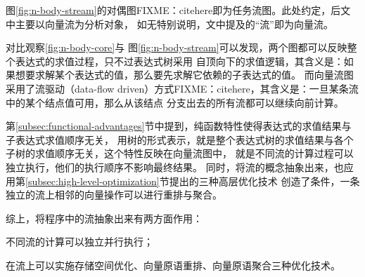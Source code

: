 图\ref{fig:n-body-stream}的对偶图FIXME：citehere即为任务流图。此处约定，后文中主要以向量流为分析对象，
如无特别说明，文中提及的“流”即为向量流。

对比观察\ref{fig:n-body-core}与
图\ref{fig:n-body-stream}可以发现，两个图都可以反映整个表达式的求值过程，只不过表达式树采用
自顶向下的求值逻辑，其含义是：如果想要求解某个表达式的值，那么要先求解它依赖的子表达式的值。
而向量流图采用了流驱动（data-flow driven）方式FIXME：citehere，其含义是：一旦某条流中的某个结点值可用，那么从该结点
分支出去的所有流都可以继续向前计算。

第\ref{subsec:functional-advantages}节中提到，纯函数特性使得表达式的求值结果与子表达式求值顺序无关，
用树的形式表示，就是整个表达式树的求值结果与各个子树的求值顺序无关，这个特性反映在向量流图中，
就是不同流的计算过程可以独立执行，他们的执行顺序不影响最终结果。
同时，将流的概念抽象出来，也应用第\ref{subsec:high-level-optimization}节提出的三种高层优化技术
创造了条件，一条独立的流上相邻的向量操作可以进行重排与聚合。

综上，将程序中的流抽象出来有两方面作用：
\begin{compactitem}
  \item 不同流的计算可以独立并行执行；
  \item 在流上可以实施存储空间优化、向量原语重排、向量原语聚合三种优化技术。
\end{compactitem}

